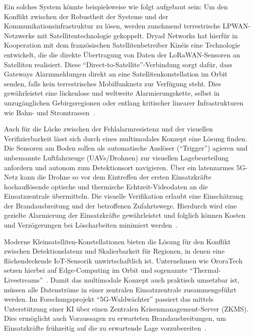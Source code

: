 Ein solches System könnte beispielsweise wie folgt aufgebaut sein:
Um den Konflikt zwischen der Robustheit der Systeme und der Kommunikationsinfrastruktur zu lösen, werden zunehmend terrestrische \acs{LPWAN}-Netzwerke mit Satellitentechnologie gekoppelt. Dryad Networks hat hierfür in Kooperation mit dem französischen Satellitenbetreiber Kinéis eine Technologie entwickelt, die die direkte Übertragung von Daten der \acs{LoRaWAN}-Sensoren an Satelliten realisiert. Diese \enquote{Direct-to-Satellite}-Verbindung sorgt dafür, dass Gateways Alarmmeldungen direkt an eine Satellitenkonstellation im Orbit senden, falls kein terrestrisches Mobilfunknetz zur Verfügung steht. Dies gewährleistet eine lückenlose und weltweite Alarmierungskette, selbst in unzugänglichen Gebirgsregionen oder entlang kritischer linearer Infrastrukturen wie Bahn- und Stromtrassen~\cite{DryadNetworks2024}.

Auch für die Lücke zwischen der Fehlalarmresistenz und der visuellen Verifizierbarkeit lässt sich durch eines multimodales Konzept eine Lösung finden. Die Sensoren am Boden sollen als automatische Auslöser (\enquote{Trigger}) agieren und unbemannte Luftfahrzeuge (\acs{UAV}s/Drohnen) zur visuellen Lagebeurteilung anfordern und autonom zum Detektionsort navigieren. Über ein latenzarmes 5G-Netz kann die Drohne so vor dem Eintreffen der ersten Einsatzkräfte hochauflösende optische und thermische Echtzeit-Videodaten an die Einsatzzentrale übermitteln. Die visuelle Verifikation erlaubt eine Einschätzung der Brandausbreitung und der betroffenen Zufahrtswege. Hierdurch wird eine gezielte Alarmierung der Einsatzkräfte gewährleistet und folglich können Kosten und Verzögerungen bei Löscharbeiten minimiert werden~\cite{Dauernheim2025, Laessig2025}.

Moderne Kleinsatelliten-Konstellationen bieten die Lösung für den Konflikt zwischen Detektionslatenz und Skalierbarkeit für Regionen, in denen eine flächendeckende \acs{IoT}-Sensorik unwirtschaftlich ist. Unternehmen wie OroraTech setzen hierbei auf Edge-Computing im Orbit und sogenannte \enquote{Thermal-Livestreams}~\cite{Seton2025}. 
Damit das multimodale Konzept auch praktisch umsetzbar ist, müssen alle Datenströme in einer zentralen Einsatzzentrale zusammengeführt werden. Im Forschungsprojekt \enquote{5G-Waldwächter} passiert das mittels Unterstützung einer KI über einen Zentralen Krisenmanagement-Server (\acs{ZKMS}). Dies ermöglicht auch Voraussagen zu erwarteten Brandausbreitungen, um Einsatzkräfte frühzeitig auf die zu erwartende Lage vorzubereiten~\cite{Laessig2025}. 




